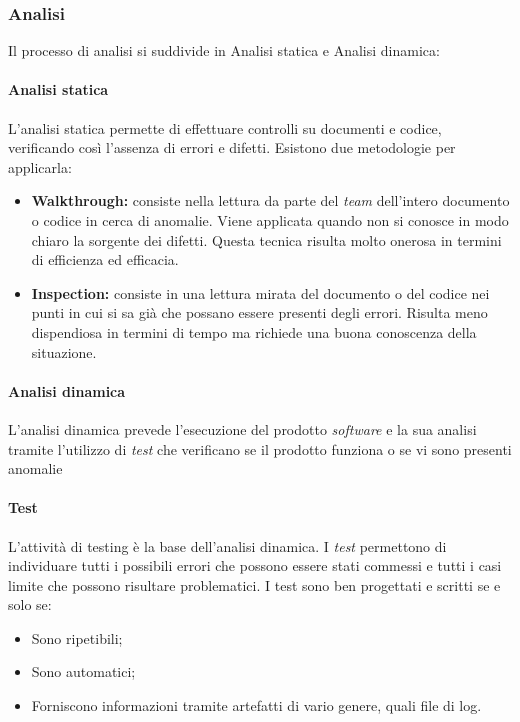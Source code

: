 				\subsubsection{Analisi}
					Il processo di analisi si suddivide in Analisi statica e Analisi dinamica:
						\paragraph*{Analisi statica}
						\aCapo{}  
							L'analisi statica permette di effettuare controlli su documenti e codice, verificando così l'assenza di errori e difetti. Esistono due metodologie per applicarla:
								\begin{itemize}
									\item \textbf{Walkthrough:} consiste nella lettura da parte del \emph{team} dell'intero documento o codice in cerca di anomalie. Viene applicata quando non si conosce in modo chiaro la sorgente dei difetti. Questa tecnica risulta molto onerosa in termini di efficienza ed efficacia.
									\item \textbf{Inspection:} consiste in una lettura mirata del documento o del codice nei punti in cui si sa già che possano essere presenti degli errori. Risulta meno dispendiosa in termini di tempo ma richiede una buona conoscenza della situazione.
								\end{itemize}
						\paragraph*{Analisi dinamica}
						\aCapo{}  
							L'analisi dinamica prevede l'esecuzione del prodotto \emph{software} e la sua analisi tramite l'utilizzo di \emph{test} che verificano se il prodotto funziona o se vi sono presenti anomalie
						\paragraph*{Test}
						\aCapo{}  
							L'attività di testing è la base dell'analisi dinamica. I \emph{test} permettono di individuare tutti i possibili errori che possono essere stati commessi e tutti i casi limite che possono risultare problematici. \newline
							I test sono ben progettati e scritti se e solo se:
								\begin{itemize}
									\item Sono ripetibili;
									\item Sono automatici;
									\item Forniscono informazioni tramite artefatti di vario genere, quali file di log.
								\end{itemize}

